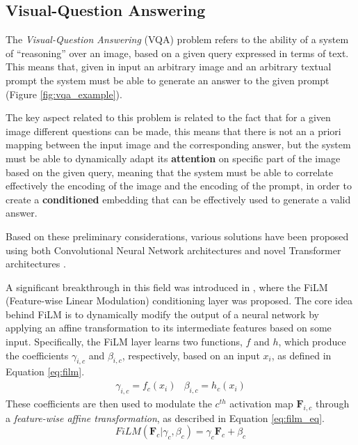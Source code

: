 \subsection{Visual-Question Answering}
\label{sec:vqa}
The \textit{Visual-Question Answering} (VQA) problem refers to the ability of a system of ``reasoning'' over an image, based on a given query expressed in terms of text. This means that, given in input an arbitrary image and an arbitrary textual prompt the system must be able to generate an answer to the given prompt (Figure \ref{fig:vqa_example}).


The key aspect related to this problem is related to the fact that for a given image different questions can be made, this means that there is not an a priori mapping between the input image and the corresponding answer, but the system must be able to dynamically adapt its \textbf{attention} on specific part of the image based on the given query, meaning that the system must be able to correlate effectively the encoding of the image and the encoding of the prompt, in order to create a \textbf{conditioned} embedding that can be effectively used to generate a valid answer.

Based on these preliminary considerations, various solutions have been proposed using both Convolutional Neural Network architectures \cite{perez2018film} and novel Transformer architectures \cite{chen2022caan,chen2024mpcct,liu2024visual}.

A significant breakthrough in this field was introduced in \cite{perez2018film}, where the FiLM (Feature-wise Linear Modulation) conditioning layer was proposed. The core idea behind FiLM is to dynamically modify the output of a neural network by applying an affine transformation to its intermediate features based on some input. Specifically, the FiLM layer learns two functions, $f$ and $h$, which produce the coefficients $\gamma_{i,c}$ and $\beta_{i,c}$, respectively, based on an input $x_{i}$, as defined in Equation \ref{eq:film}.
\begin{equation}
    \label{eq:film}
    \begin{matrix}
        \gamma_{i,c} = f_{c}(x_{i}) & 
        \beta_{i,c} = h_{c}(x_{i})
    \end{matrix}
\end{equation}
These coefficients are then used to modulate the $c^{th}$ activation map $\textbf{F}_{i,c}$ through a \textit{feature-wise affine transformation}, as described in Equation \ref{eq:film_eq}.
\begin{equation}
    \label{eq:film_eq}
    FiLM(\textbf{F}_{c}|\gamma_{c}, \beta_{c}) = \gamma_{c} \textbf{F}_{c} + \beta_{c}
\end{equation}

